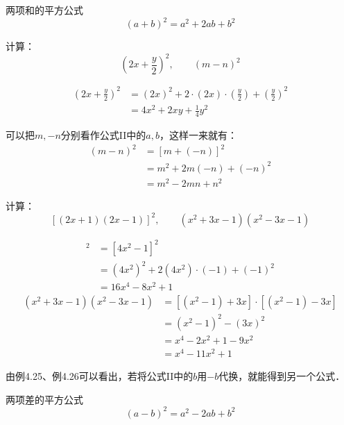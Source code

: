 \begin{blk}{两项和的平方公式}
    \begin{equation*}
        (a+b)^2=a^2+2ab+b^2\tag{II}
    \end{equation*}
\end{blk}

\begin{example}
    计算：
    \[\left(2x+\frac{y}{2}\right)^2,\qquad (m-n)^2  \]
\end{example}

\begin{solution}
\[\begin{split}
    \left(2x+\frac{y}{2}\right)^2&=(2x)^2+2\cdot (2x)\cdot \left(\frac{y}{2}\right)+\left(\frac{y}{2}\right)^2\\
    &=4x^2+2xy+\frac{1}{4}y^2
\end{split}\]

可以把$m,-n$分别看作公式II中的$a,b$，这样一来就有：
\[\begin{split}
    (m-n)^2&=[m+(-n)]^2\\
    &=m^2+2m(-n)+(-n)^2\\
    &=m^2-2mn+n^2
\end{split}\]

\end{solution}

\begin{example}
计算：
\[[(2x+1)(2x-1)]^2,\qquad (x^2+3x-1)(x^2-3x-1) \]
\end{example}

\begin{solution}
\begin{align*}
    [(2x+1)(2x-1)]^2&=[4x^2-1]^2 \tag{公式I}\\
    &=(4x^2)^2+2(4x^2)\cdot (-1)+(-1)^2 \tag{公式II}\\
    &=16x^4-8x^2+1
\end{align*}    
\begin{align*}
    (x^2+3x-1)(x^2-3x-1) &= [(x^2-1)+3x]\cdot [(x^2-1)-3x] \\
    &=(x^2-1)^2-(3x)^2\\
    &=x^4-2x^2+1-9x^2\\
    &=x^4-11x^2+1
\end{align*}  
\end{solution}

由例4.25、例4.26可以看出，若将公式II中的$b$用$-b$代换，就能得到另一个公式．

\begin{blk}{两项差的平方公式}
\begin{equation*}
    (a-b)^2=a^2-2ab+b^2 \tag{III}
\end{equation*}    
\end{blk}

